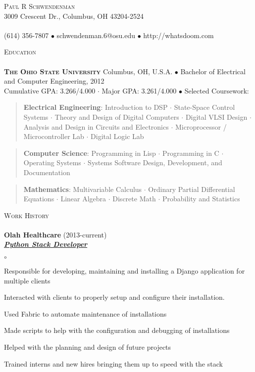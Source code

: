 \documentclass{article}
\newcommand{\area}[2]{\vspace*{-9pt} \begin{verse}\textbf{#1}:   #2 \end{verse}  }
\newcommand{\lineunder}{\vspace*{-8pt} \\ \hspace*{-18pt} \hrulefill \\}
\newcommand{\header}[1]{{\hspace*{-15pt}\vspace*{6pt} \textsc{#1}} \vspace*{-6pt} \lineunder}
\newcommand{\employer}[3]{{ \textbf{#1} (#2)\\ \underline{\textbf{\emph{#3}}}\\  }}
\newcommand{\contact}[3]{
\vspace*{-8pt}
\begin{center}
{\LARGE \scshape {#1}}\\
#2 \lineunder 
#3
\end{center}
\vspace*{-8pt}
}
\newenvironment{achievements}{\begin{list}{$\circ$}{\topsep 0pt \itemsep -2pt}}{\vspace*{4pt}\end{list}}
\newcommand{\schoolwithcourses}[4]{
 \textbf{#1} #2 $\bullet$ #3\\ 
#4 $\bullet$  Selected Coursework:\\
\vspace*{5pt}
}
\begin{document}
\small
\smallskip
\vspace*{-44pt}

\contact{Paul R Schwendenman}
{3009 Crescent Dr., Columbus, OH 43204-2524}
{(614) 356-7807 $\bullet$ schwendenman.6@osu.edu  $\bullet$ http://whatsdoom.com}

\header{Education}

\schoolwithcourses{\textsc{The Ohio State University}}{Columbus, OH, U.S.A.}{Bachelor of Electrical and Computer Engineering, 2012}
{Cumulative GPA: 3.266/4.000 $\cdot$ Major GPA: 3.261/4.000}
	\area{Electrical Engineering}{Introduction to DSP $\cdot$ State-Space Control Systems $\cdot$ Theory and Design of Digital Computers $\cdot$ 
		Digital VLSI Design $\cdot$ Analysis and Design in Circuits and Electronics $\cdot$ Microprocessor / Microcontroller Lab $\cdot$ Digital Logic Lab}
	\area{Computer Science}{Programming in Lisp $\cdot$ Programming in C
		$\cdot$ Operating Systems $\cdot$ Systems Software Design, Development, and Documentation}
	\area{Mathematics}{Multivariable Calculus $\cdot$ Ordinary Partial Differential Equations $\cdot$ Linear Algebra $\cdot$ Discrete Math $\cdot$
		Probability and Statistics}



\header{Work History}
\employer{Olah Healthcare}{2013-current}{Python Stack Developer}
	\begin{achievements}
	\item Responsible for developing, maintaining and installing a Django application for multiple clients
	\item Interacted with clients to properly setup and configure their installation.
	\item Used Fabric to automate maintenance of installations
	\item Made scripts to help with the configuration and debugging of
	installations
	\item Helped with the planning and design of future projects
	\item Trained interns and new hires bringing them up to speed with
	the stack
	\end{achievements}
\end{document}
